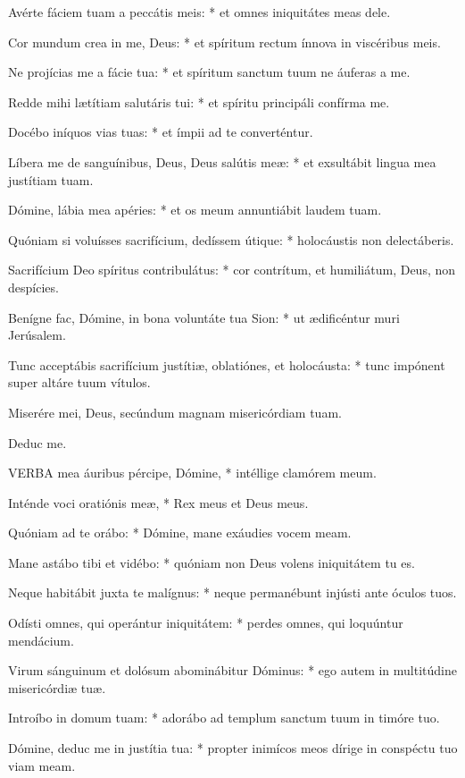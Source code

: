 Avérte fáciem tuam a peccátis meis: * et omnes iniquitátes meas dele.

Cor mundum crea in me, Deus: * et spíritum rectum ínnova in viscéribus meis.

Ne projícias me a fácie tua: * et spíritum sanctum tuum ne áuferas a me.

Redde mihi lætítiam salutáris tui: * et spíritu principáli confírma me.

Docébo iníquos vias tuas: * et ímpii ad te converténtur.

Líbera me de sanguínibus, Deus, Deus salútis meæ: * et exsultábit lingua mea justítiam tuam.

Dómine, lábia mea apéries: * et os meum annuntiábit laudem tuam.

Quóniam si voluísses sacrifícium, dedíssem útique: * holocáustis non delectáberis.

Sacrifícium Deo spíritus contribulátus: * cor contrítum, et humiliátum, Deus, non despícies.

Benígne fac, Dómine, in bona voluntáte tua Sion: * ut ædificéntur muri Jerúsalem.

Tunc acceptábis sacrifícium justítiæ, oblatiónes, et holocáusta: * tunc impónent super altáre tuum vítulos.

 Miserére mei, Deus, secúndum magnam misericórdiam tuam.

 Deduc me.


\lettrine[lines=2]{V}{ERBA} mea áuribus pércipe, Dómine, * intéllige clamórem meum.

Inténde voci oratiónis meæ, * Rex meus et Deus meus.

Quóniam ad te orábo: * Dómine, mane exáudies vocem meam.

Mane astábo tibi et vidébo: * quóniam non Deus volens iniquitátem tu es.

Neque habitábit juxta te malígnus: * neque permanébunt injústi ante óculos tuos.

Odísti omnes, qui operántur iniquitátem: * perdes omnes, qui loquúntur mendácium.

Virum sánguinum et dolósum abominábitur Dóminus: * ego autem in multitúdine misericórdiæ tuæ.

Introíbo in domum tuam: * adorábo ad templum sanctum tuum in timóre tuo.

Dómine, deduc me in justítia tua: * propter inimícos meos dírige in conspéctu tuo viam meam.

